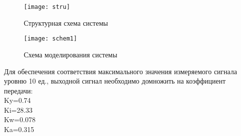 \documentclass[a4paper, 12pt]{article}
\begin{document}
\newpage
\begin{figure}[h]
	\begin{center}
		\texttt{[image: stru]}
		\caption{Структурная схема системы}
	\end{center}  
\end{figure}
\begin{figure}[h!]
\begin{center}
\texttt{[image: schem1]}
\caption{Схема моделирования системы}
\end{center}  
\end{figure}
\newpage
Для обеспечения соответствия максимального значения измеряемого сигнала уровню 10 ед., выходной сигнал необходимо домножить на коэффициент передачи:\\
Ky=0.74\\ Ki=28.33\\ Kw=0.078\\ Ka=0.315\\


\newpage
\end{document}
